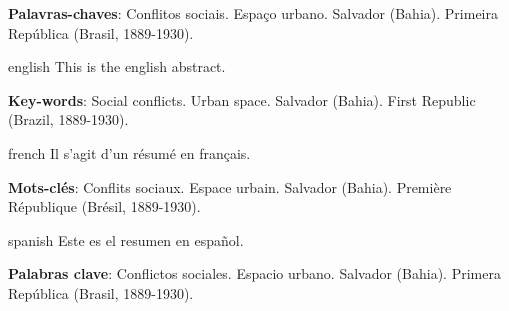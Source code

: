 
\setlength{\absparsep}{18pt} %
\begin{resumo}
 

 \textbf{Palavras-chaves}: Conflitos sociais. Espaço urbano. Salvador (Bahia). Primeira República (Brasil, 1889-1930).
\end{resumo}

\begin{resumo}[Abstract]
 \begin{otherlanguage*}{english}
   This is the english abstract.

   \vspace{\onelineskip}
 
   \noindent 
   \textbf{Key-words}: Social conflicts. Urban space. Salvador (Bahia). First Republic (Brazil, 1889-1930).
 \end{otherlanguage*}
\end{resumo}

\begin{resumo}[Résumé]
 \begin{otherlanguage*}{french}
    Il s'agit d'un résumé en français.
 
   \textbf{Mots-clés}: Conflits sociaux. Espace urbain. Salvador (Bahia). Première République (Brésil, 1889-1930).
 \end{otherlanguage*}
\end{resumo}

\begin{resumo}[Resumen]
 \begin{otherlanguage*}{spanish}
   Este es el resumen en español.
  
   \textbf{Palabras clave}: Conflictos sociales. Espacio urbano. Salvador (Bahia). Primera República (Brasil, 1889-1930).
 \end{otherlanguage*}
\end{resumo}
